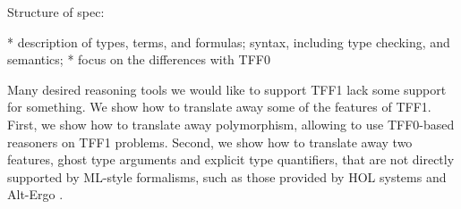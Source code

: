 Structure of spec:

  * description of types, terms, and formulas; syntax, including type checking,
    and semantics;
  * focus on the differences with TFF0

Many desired reasoning tools we would like to support TFF1 lack some support for
something. We show how to translate away some of the features of TFF1. First, we
show how to translate away polymorphism, allowing to use TFF0-based reasoners on
TFF1 problems. Second, we show how to translate away two features,
ghost type arguments and explicit type quantifiers, that are not directly
supported by ML-style formalisms, such as those provided by HOL systems
\cite{gordon-melham-1993,harrison-1996,nipkow-et-al-2002} and Alt-Ergo
\cite{conchon08smt}.
